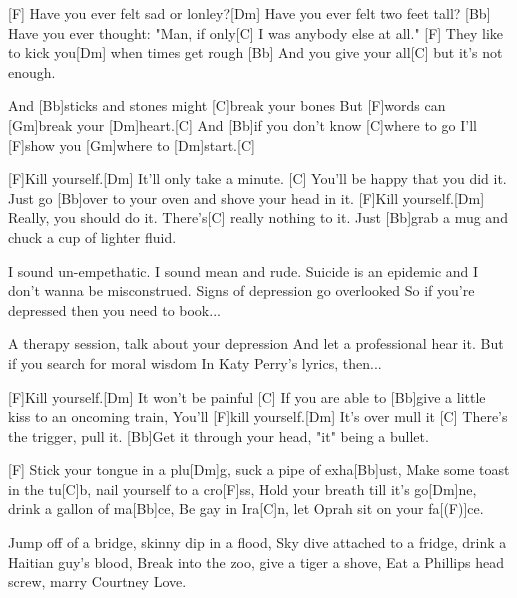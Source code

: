 

\begin{guitar}
	[F] Have you ever felt sad or lonley?[Dm] Have you ever felt two feet tall?
	[Bb] Have you ever thought: "Man, if only[C] I was anybody else at all."
	[F] They like to kick you[Dm] when times get rough
	[Bb] And you give your all[C] but it's not enough.
	
	And [Bb]sticks and stones might [C]break your bones
	But [F]words can [Gm]break your [Dm]heart.[C]{}
	And [Bb]if you don't know [C]where to go
	I'll [F]show you [Gm]where to [Dm]start.[C]{}
	
	\begin{highlightbar}
		[F]Kill yourself.[Dm] It'll only take a minute.
		[C] You'll be happy that you did it. Just go [Bb]over to your oven and shove your head in it.
		[F]Kill yourself.[Dm] Really, you should do it.
		There's[C] really nothing to it. Just [Bb]grab a mug and chuck a cup of lighter fluid.
	\end{highlightbar}
	
	\songsection{Verse 2}
	I sound un-empethatic. I sound mean and rude.
	Suicide is an epidemic and I don't wanna be misconstrued.
	Signs of depression go overlooked
	So if you're depressed then you need to book...
	
	\songsection{Bridge}
	A therapy session, talk about your depression
	And let a professional hear it.
	But if you search for moral wisdom
	In Katy Perry's lyrics, then...
	
	\pagebreak
	
	\begin{highlightbar}
		\songsection{Chorus}
		[F]Kill yourself.[Dm] It won't be painful
		[C] If you are able to [Bb]give a little kiss to an oncoming train,
		You'll [F]kill yourself.[Dm] It's over mull it
		[C] There's the trigger, pull it. [Bb]Get it through your head, "it" being a bullet.
	\end{highlightbar}
	
	[F] Stick your tongue in a plu[Dm]g, suck a pipe of exha[Bb]ust,
	Make some toast in the tu[C]b, nail yourself to a cro[F]ss,
	Hold your breath till it's go[Dm]ne, drink a gallon of ma[Bb]ce,
	Be gay in Ira[C]n, let Oprah sit on your fa[(F)]ce.
	
	Jump off of a bridge, skinny dip in a flood,
	Sky dive attached to a fridge, drink a Haitian guy's blood,
	Break into the zoo, give a tiger a shove,
	Eat a Phillips head screw, marry Courtney Love.
\end{guitar}

